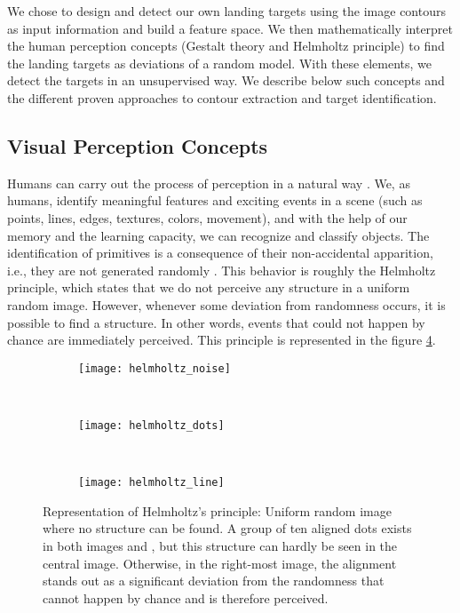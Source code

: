 We chose to design and detect our own landing targets using the image contours as input information and build a feature space. We then mathematically interpret the human perception concepts (Gestalt theory and Helmholtz principle) to find the landing targets as deviations of a random model.  With these elements, we detect the targets in an unsupervised way. We describe below such concepts and the different proven approaches to contour extraction and target identification.


\subsection{Visual Perception Concepts}
Humans can carry out the process of perception in a natural way \citep{Petitot:Neurogeometrie:2008}. We, as humans, identify meaningful features and exciting events in a scene (such as points, lines, edges, textures, colors, movement), and with the help of our memory and the learning capacity, we can recognize and classify objects. The identification of primitives is a consequence of their non-accidental apparition, i.e., they are not generated randomly \citep{Attneave:PR:1954}. This behavior is roughly the Helmholtz principle, which states that we do not perceive any structure in a uniform random image. However, whenever some deviation from randomness occurs, it is possible to find a structure. In other words, events that could not happen by chance are immediately perceived. This principle is represented in the figure \ref{fig:helmholtz_principle}.

\begin{figure}[!ht]
    \centering
    \begin{subfigure}[b]{0.25\textwidth}
        \texttt{[image: helmholtz\_noise]}
        \caption{}
        \label{fig:helmholtz_noise}
    \end{subfigure}
        ~ %
    \begin{subfigure}[b]{0.25\textwidth}
        \texttt{[image: helmholtz\_dots]}
        \caption{}
        \label{fig:helmholtz_dots}
    \end{subfigure}
        ~ %
    \begin{subfigure}[b]{0.25\textwidth}
        \texttt{[image: helmholtz\_line]}
        \caption{}
        \label{fig:helmholtz_line}
    \end{subfigure}
        
    \caption{Representation of Helmholtz's principle:  Uniform random image where no structure can be found. A group of ten aligned dots exists in both images and , but this structure can hardly be seen in the central image. Otherwise, in the right-most image, the alignment stands out as a significant deviation from the randomness that cannot happen by chance and is therefore perceived.}\label{fig:helmholtz_principle}
\end{figure}

